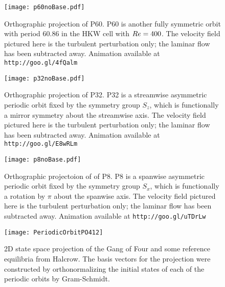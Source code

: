 \begin{figure}
\centerline{\texttt{[image: p60noBase.pdf]}}
\caption{Orthographic projection of P60. P60 is another fully symmetric orbit with period 60.86 in the HKW cell with $Re = 400$.  The velocity field pictured here is the turbulent perturbation only; the laminar flow has been subtracted away.{ Animation available at {\tt http://goo.gl/4fQalm}}}\label{fig:p60}
\end{figure}


\begin{figure}
\centerline{\texttt{[image: p32noBase.pdf]}}
\caption{Orthographic projection of P32. P32 is a streamwise asymmetric periodic orbit fixed by the symmetry group $S_z$, which is functionally a mirror symmetry about the streamwise axis. The velocity field pictured here is the turbulent perturbation only; the laminar flow has been subtracted away. Animation available at {\tt http://goo.gl/E8wRLm}}\label{fig:p32}
\end{figure}


\begin{figure}
\centerline{\texttt{[image: p8noBase.pdf]}}
\caption{Orthographic projectoion of  of P8. P8 is a spanwise asymmetric periodic orbit fixed by the symmetry group $S_x$, which is functionally a rotation by $\pi$ about the spanwise axis. The velocity field pictured here is the turbulent perturbation only; the laminar flow has been subtracted away. Animation available at {\tt http://goo.gl/uTDrLw}}\label{fig:p8}
\end{figure}



\begin{figure}[h]
\texttt{[image: PeriodicOrbitPO412]}
\caption{2D state space projection of the Gang of Four and some reference equilibria from Halcrow. The basis vectors for the projection were constructed by orthonormalizing the initial states of each of the periodic orbits by Gram-Schmidt.}\label{fig:POStateSpace}
\end{figure}

